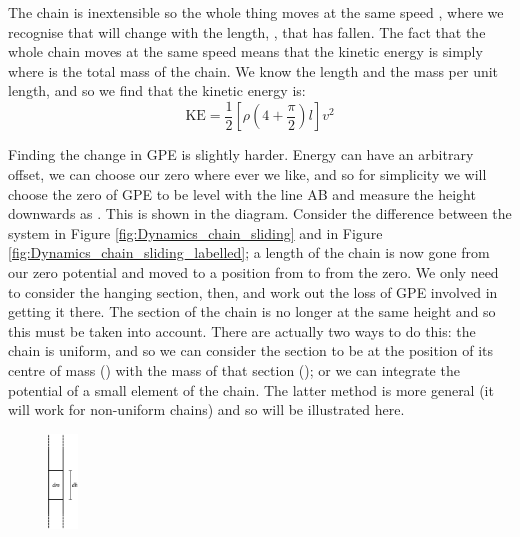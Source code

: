 \begin{problem}
{\begin{enumerate}
The chain is inextensible so the whole thing moves at the same speed , where we recognise that  will change with the length, , that has fallen. The fact that the whole chain moves at the same speed means that the kinetic energy is simply  where  is the total mass of the chain. We know the length and the mass per unit length, and so we find that the kinetic energy is:
	\begin{equation*} 
	\text{KE} = \frac{1}{2}\left[\rho\left(4 + \frac{\pi}{2}\right)l\right]v^{2} 
	\end{equation*}

Finding the change in GPE is slightly harder. Energy can have an arbitrary offset, we can choose our zero where ever we like, and so for simplicity we will choose the zero of GPE to be level with the line AB and measure the height downwards as . This is shown in the diagram. Consider the difference between the system in Figure \ref{fig:Dynamics_chain_sliding} and in Figure \ref{fig:Dynamics_chain_sliding_labelled}; a length  of the chain is now gone from our zero potential and moved to a position from  to  from the zero. We only need to consider the hanging section, then, and work out the loss of GPE involved in getting it there. The section of the chain is no longer at the same height and so this must be taken into account. There are actually two ways to do this: the chain is uniform, and so we can consider the section to be at the position of its centre of mass () with the mass of that section (); or we can integrate the potential of a small element of the chain. The latter method is more general (it will work for non-uniform chains) and so will be illustrated here.

\begin{figure}[h]
\centering
\includegraphics[width=0.07\textwidth]{../../../figures/Dynamics_chain_element.svg}
\caption{}\label{fig:Dynamics_chain_element}
\end{figure}


\end{enumerate}}
\end{problem}
